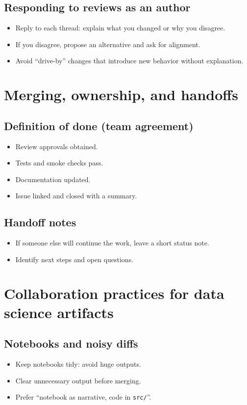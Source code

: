 \subsection{Responding to reviews as an author}
\begin{itemize}
\item Reply to each thread: explain what you changed or why you disagree.
\item If you disagree, propose an alternative and ask for alignment.
\item Avoid ``drive-by'' changes that introduce new behavior without explanation.
\end{itemize}

\section{Merging, ownership, and handoffs}
\subsection{Definition of done (team agreement)}
\begin{itemize}
\item Review approvals obtained.
\item Tests and smoke checks pass.
\item Documentation updated.
\item Issue linked and closed with a summary.
\end{itemize}

\subsection{Handoff notes}
\begin{itemize}
\item If someone else will continue the work, leave a short status note.
\item Identify next steps and open questions.
\end{itemize}

\section{Collaboration practices for data science artifacts}
\subsection{Notebooks and noisy diffs}
\begin{itemize}
\item Keep notebooks tidy: avoid huge outputs.
\item Clear unnecessary output before merging.
\item Prefer ``notebook as narrative, code in \texttt{src/}''.
\end{itemize}

